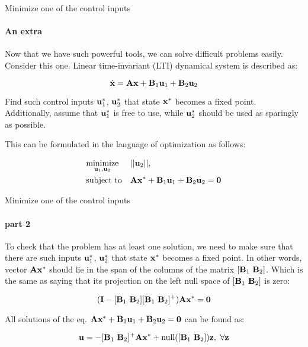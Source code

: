 \documentclass{beamer}
\begin{document}
\begin{frame}{Minimize one of the control inputs}
\framesubtitle{An extra}
\begin{flushleft}

Now that we have such powerful tools, we can solve difficult problems easily. Consider this one. Linear time-invariant (LTI) dynamical system is described as:

\begin{equation}
    \dot{\mathbf{x}} = \mathbf{A} \mathbf{x} + \mathbf{B}_1 \mathbf{u}_1 + \mathbf{B}_2 \mathbf{u}_2
\end{equation}

Find such control inputs $\mathbf{u}^*_1$, $\mathbf{u}^*_2$ that state $\mathbf{x}^*$ becomes a fixed point. Additionally, assume that $\mathbf{u}^*_1$ is free to use, while $\mathbf{u}^*_2$ should be used as sparingly as possible.

\bigskip

This can be formulated in the language of optimization as follows:

\begin{equation}
\label{eq:task_u1u2}
\begin{aligned}
& \underset{\mathbf{u}_1, \mathbf{u}_2}{\text{minimize}}
& & || \mathbf{u}_2 ||, \\
& \text{subject to}
& & \mathbf{A} \mathbf{x}^* + \mathbf{B}_1 \mathbf{u}_1 + \mathbf{B}_2 \mathbf{u}_2 = \mathbf{0}
\end{aligned}
\end{equation}

\end{flushleft}
\end{frame}


\begin{frame}{Minimize one of the control inputs}
\framesubtitle{part 2}
\begin{flushleft}

To check that the problem has at least one solution, we need to make sure that there are such inputs $\mathbf{u}^*_1$, $\mathbf{u}^*_2$ that state $\mathbf{x}^*$ becomes a fixed point. In other words, vector $\mathbf{A}\mathbf{x}^*$ should lie in the span of the columns of the matrix $[\mathbf{B}_1 \ \mathbf{B}_2]$. Which is the same as saying that its projection on the left null space of $[\mathbf{B}_1 \ \mathbf{B}_2]$ is zero:

\begin{equation}
    (\mathbf{I} - [\mathbf{B}_1 \ \mathbf{B}_2] [\mathbf{B}_1 \ \mathbf{B}_2]^+) \mathbf{A}\mathbf{x}^* = \mathbf{0}
\end{equation}

All solutions of the eq. $\mathbf{A} \mathbf{x}^* + \mathbf{B}_1 \mathbf{u}_1 + \mathbf{B}_2 \mathbf{u}_2 = \mathbf{0}$ can be found as:

\begin{equation}
    \mathbf{u} = - [\mathbf{B}_1 \ \mathbf{B}_2]^+ \mathbf{A}\mathbf{x}^* + \text{null}([\mathbf{B}_1 \ \mathbf{B}_2])\mathbf{z}, \ \forall \mathbf{z}
\end{equation}

\end{flushleft}
\end{frame}
\end{document}
